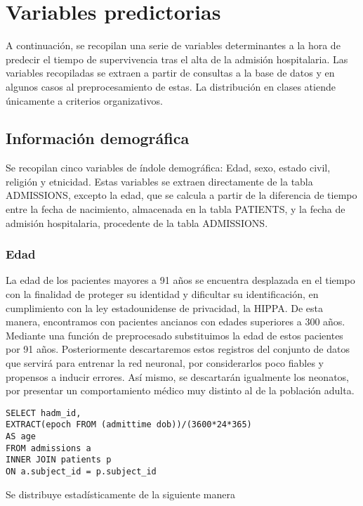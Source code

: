 \documentclass{report}
\begin{document}
\section{Variables predictorias}

A continuación, se recopilan una serie de variables determinantes a la hora de predecir el tiempo de
supervivencia tras el alta de la admisión hospitalaria. Las variables recopiladas se extraen a partir de consultas a la base de
datos y en algunos casos al preprocesamiento de estas. La distribución en clases atiende únicamente a criterios organizativos. 

\subsection{Información demográfica}

Se recopilan cinco variables de índole demográfica: Edad, sexo, estado
civil, religión y etnicidad. Estas variables se extraen directamente de
la tabla ADMISSIONS, excepto la edad, que se calcula a partir de la
diferencia de tiempo entre la fecha de nacimiento, almacenada en la
tabla PATIENTS, y la fecha de admisión hospitalaria, procedente de la
tabla ADMISSIONS.

\subsubsection{Edad}

La edad de los pacientes mayores a 91 años se encuentra desplazada en el
tiempo con la finalidad de proteger su identidad y dificultar su
identificación, en cumplimiento con la ley estadounidense de privacidad,
la HIPPA. De esta manera, encontramos con pacientes ancianos con edades
superiores a 300 años. Mediante una función de preprocesado substituimos
la edad de estos pacientes por 91 años. Posteriormente descartaremos
estos registros del conjunto de datos que servirá para entrenar la red
neuronal, por considerarlos poco fiables y propensos a inducir errores.
Así mismo, se descartarán igualmente los neonatos, por presentar un
comportamiento médico muy distinto al de la población adulta.
\begin{verbatim}
SELECT hadm_id, 
EXTRACT(epoch FROM (admittime dob))/(3600*24*365)
AS age
FROM admissions a
INNER JOIN patients p
ON a.subject_id = p.subject_id
\end{verbatim}

Se distribuye estadísticamente de la siguiente manera
\end{document}
